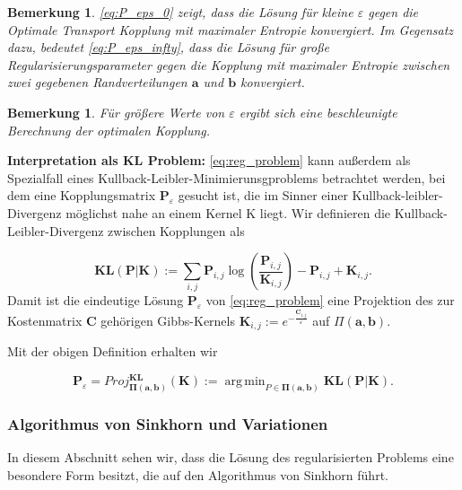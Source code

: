 \documentclass[11pt,a4paper]{article}
\DeclareMathOperator*{\argmin}{arg\,min}
\newtheorem{remark}[theorem]{Bemerkung}
\numberwithin{equation}{section}
\begin{document}
	\begin{remark}
		\autoref{eq:P_eps_0} zeigt, dass die Lösung für kleine $\varepsilon$ gegen die Optimale Transport Kopplung mit maximaler Entropie konvergiert. Im Gegensatz dazu, bedeutet \autoref{eq:P_eps_infty}, dass die Lösung für große Regularisierungsparameter gegen die Kopplung mit maximaler Entropie zwischen zwei gegebenen Randverteilungen $\boldsymbol{a}$ und $\boldsymbol{b}$ konvergiert.\\
		
	\end{remark}
	
	\begin{remark}
		Für größere Werte von $\varepsilon$ ergibt sich eine beschleunigte Berechnung der optimalen Kopplung.
	\end{remark}
	
	\noindent \textbf{Interpretation als KL Problem:} \autoref{eq:reg_problem} kann außerdem als Spezialfall eines Kullback-Leibler-Minimierunsgproblems betrachtet werden, bei dem eine Kopplungsmatrix $\boldsymbol{P}_\varepsilon$ gesucht ist, die im Sinner einer Kullback-leibler-Divergenz möglichst nahe an einem Kernel K liegt.
	Wir definieren die Kullback-Leibler-Divergenz zwischen Kopplungen als
	
	\begin{equation}
	\boldsymbol{KL}(\boldsymbol{P}|\boldsymbol{K}) := \sum_{i,j} \boldsymbol{P}_{i,j} \log \left(\frac{\boldsymbol{P}_{i,j}}{\boldsymbol{K}_{i,j}} \right) - \boldsymbol{P}_{i,j} + \boldsymbol{K}_{i,j}. \label{eq:KL_div_discrete}
	\end{equation}
	Damit ist die eindeutige Lösung $\boldsymbol{P}_\varepsilon$ von \autoref{eq:reg_problem} eine Projektion des zur Kostenmatrix $\boldsymbol{C}$ gehörigen Gibbs-Kernels $\boldsymbol{K}_{i,j} := e^{-\frac{\boldsymbol{C}_{i,j}}{\varepsilon}}$ auf $\Pi (\boldsymbol{a}, \boldsymbol{b})$.
	
	Mit der obigen Definition erhalten wir
	
	\begin{equation}
	\boldsymbol{P}_\varepsilon = Proj_{\boldsymbol{\Pi} (\boldsymbol{a}, \boldsymbol{b})}^{\boldsymbol{KL}}(\boldsymbol{K}) := \argmin_{P \in \boldsymbol{\Pi} (\boldsymbol{a}, \boldsymbol{b})}{\boldsymbol{KL}(\boldsymbol{P}|\boldsymbol{K})}.
	\end{equation}
	
	\subsubsection{Algorithmus von Sinkhorn und Variationen}
	In diesem Abschnitt sehen wir, dass die Lösung des regularisierten Problems eine besondere Form besitzt, die auf den Algorithmus von Sinkhorn führt.
	
\end{document}

